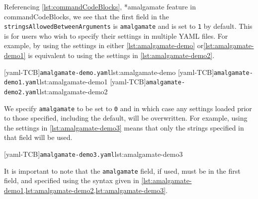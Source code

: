  Referencing \vref{lst:commandCodeBlocks}, *{amalgamate feature in
 commandCodeBlocks}, we see that the first field in the
 \texttt{stringsAllowedBetweenArguments} is \texttt{amalgamate} and is set to \texttt{1}
 by default. This is for users who wish to specify their settings in multiple YAML files.
 For example, by using the settings in either \cref{lst:amalgamate-demo}
 or\cref{lst:amalgamate-demo1} is equivalent to using the settings in
 \cref{lst:amalgamate-demo2}.%

 \begin{cmhtcbraster}[raster columns=3,
   raster left skip=-3.5cm,
   raster right skip=-2cm,
   raster column skip=.03\linewidth]
  [yaml-TCB]{\texttt{amalgamate-demo.yaml}}{lst:amalgamate-demo}
  [yaml-TCB]{\texttt{amalgamate-demo1.yaml}}{lst:amalgamate-demo1}
  [yaml-TCB]{\texttt{amalgamate-demo2.yaml}}{lst:amalgamate-demo2}
 \end{cmhtcbraster}

 We specify \texttt{amalgamate} to be set to \texttt{0} and in which case any settings
 loaded prior to those specified, including the default, will be overwritten. For
 example, using the settings in \cref{lst:amalgamate-demo3} means that only the strings
 specified in that field will be used.

 [yaml-TCB]{\texttt{amalgamate-demo3.yaml}}{lst:amalgamate-demo3}

 It is important to note that the \texttt{amalgamate} field, if used, must be in the
 first field, and specified using the syntax given in
 \cref{lst:amalgamate-demo1,lst:amalgamate-demo2,lst:amalgamate-demo3}.

